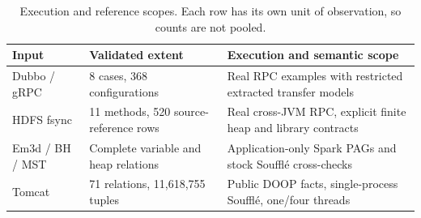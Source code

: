 \begin{table}[t]
\centering
\small
\caption{Execution and reference scopes. Each row has its own unit of observation, so counts are not pooled.}
\label{tab:reference-coverage}
\begin{tabular}{p{.20\linewidth}p{.30\linewidth}p{.40\linewidth}}
\toprule
\textbf{Input} & \textbf{Validated extent} & \textbf{Execution and semantic scope} \\
\midrule
Dubbo / gRPC & 8 cases, 368 configurations & Real RPC examples with restricted extracted transfer models \\
HDFS fsync & 11 methods, 520 source-reference rows & Real cross-JVM RPC, explicit finite heap and library contracts \\
Em3d / BH / MST & Complete variable and heap relations & Application-only Spark PAGs and stock Souffl\'e cross-checks \\
Tomcat & 71 relations, 11,618,755 tuples & Public DOOP facts, single-process Souffl\'e, one/four threads \\
\bottomrule
\end{tabular}
\end{table}

